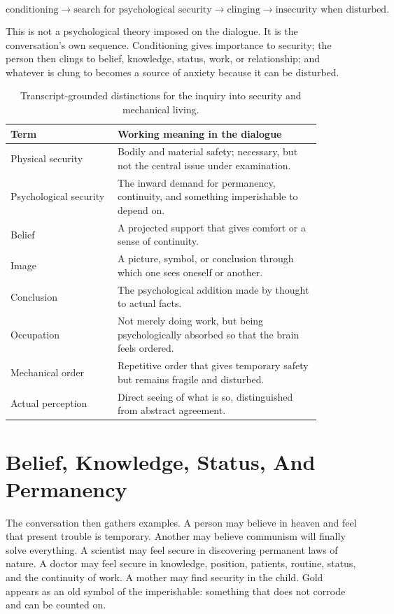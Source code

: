 \begin{equation}
\text{conditioning}
\longrightarrow
\text{search for psychological security}
\longrightarrow
\text{clinging}
\longrightarrow
\text{insecurity when disturbed}.
\end{equation}

This is not a psychological theory imposed on the dialogue. It is the conversation's own sequence. Conditioning gives importance to security; the person then clings to belief, knowledge, status, work, or relationship; and whatever is clung to becomes a source of anxiety because it can be disturbed.

\begin{table}
\centering
\begin{tabular}{|p{0.30\linewidth}|p{0.58\linewidth}|}
\hline
\textbf{Term} & \textbf{Working meaning in the dialogue} \\
\hline
Physical security & Bodily and material safety; necessary, but not the central issue under examination. \\
\hline
Psychological security & The inward demand for permanency, continuity, and something imperishable to depend on. \\
\hline
Belief & A projected support that gives comfort or a sense of continuity. \\
\hline
Image & A picture, symbol, or conclusion through which one sees oneself or another. \\
\hline
Conclusion & The psychological addition made by thought to actual facts. \\
\hline
Occupation & Not merely doing work, but being psychologically absorbed so that the brain feels ordered. \\
\hline
Mechanical order & Repetitive order that gives temporary safety but remains fragile and disturbed. \\
\hline
Actual perception & Direct seeing of what is so, distinguished from abstract agreement. \\
\hline
\end{tabular}
\caption{Transcript-grounded distinctions for the inquiry into security and mechanical living.}
\end{table}

\section{Belief, Knowledge, Status, And Permanency}

The conversation then gathers examples. A person may believe in heaven and feel that present trouble is temporary. Another may believe communism will finally solve everything. A scientist may feel secure in discovering permanent laws of nature. A doctor may feel secure in knowledge, position, patients, routine, status, and the continuity of work. A mother may find security in the child. Gold appears as an old symbol of the imperishable: something that does not corrode and can be counted on.

